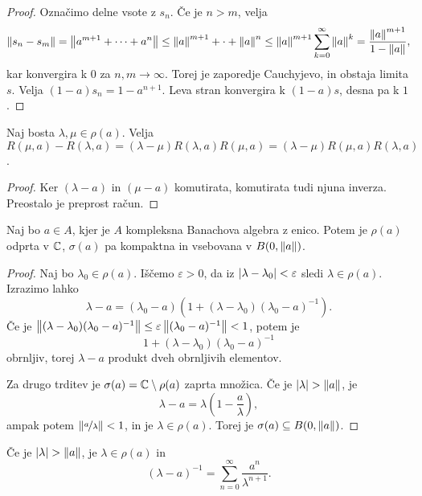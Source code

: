 \begin{proof}
  Označimo delne vsote z $s_n$.
  Če je $n > m$, velja
  \[
	\left\lVert s_n - s_m\right\rVert
	= \left\lVert a^{m+1} + \cdots + a^n\right\rVert
	\le \left\lVert a\right\rVert^{m+1} + \cdot + \left\lVert a\right\rVert^n
	\le \left\lVert a\right\rVert^{m+1} \sum_{k=0}^\infty \left\lVert a\right\rVert^k
	= \frac{\left\lVert a\right\rVert^{m+1}}{1 - \left\lVert a\right\rVert},
  \]
  kar konvergira k $0$ za $n, m \to \infty$.
  Torej je zaporedje Cauchyjevo, in obstaja limita $s$.
  Velja $(1 - a) s_n = 1 - a^{n+1}$.
  Leva stran konvergira k $(1-a)s$, desna pa k $1$.
\end{proof}

\begin{lema}
  Naj bosta $\lambda, \mu \in \rho(a)$.
  Velja $R(\mu, a) - R(\lambda, a) = (\lambda - \mu) R(\lambda, a) R(\mu, a) =
  (\lambda - \mu) R(\mu,a) R(\lambda, a)$.
\end{lema}

\begin{proof}
  Ker $(\lambda - a)$ in $(\mu - a)$ komutirata, komutirata tudi njuna inverza.
  Preostalo je preprost račun.
\end{proof}

\begin{trditev}
  Naj bo $a \in A$, kjer je $A$ kompleksna Banachova algebra z enico.
  Potem je $\rho(a)$ odprta v $\mathbb{C}$, $\sigma(a)$ pa kompaktna in vsebovana v
  $B(0, \left\lVert a\right\rVert)$.
\end{trditev}

\begin{proof}
  Naj bo $\lambda_0 \in \rho(a)$.
  Iščemo $\varepsilon > 0$, da iz $\left| \lambda - \lambda_0 \right| < \varepsilon$
  sledi $\lambda \in \rho(a)$.
  Izrazimo lahko
  \[
	\lambda - a = (\lambda_0 - a)(1 + (\lambda - \lambda_0)(\lambda_0 - a)^{-1}).
  \]
  Če je $\left\lVert(\lambda - \lambda_0)(\lambda_0 -a)^{-1}\right\rVert \le \varepsilon
  \left\lVert(\lambda_0 - a)^{-1}\right\rVert < 1$, potem je
  \[
	1 + (\lambda - \lambda_0)(\lambda_0 - a)^{-1}
  \]
  obrnljiv, torej $\lambda - a$ produkt dveh obrnljivih elementov.

  Za drugo trditev je $\sigma(a) = \mathbb{C} \setminus \rho(a)$ zaprta množica.
  Če je $\left| \lambda \right| > \left\lVert a\right\rVert$, je
  \[
	\lambda - a = \lambda (1 - \frac{a}{\lambda}),
  \]
  ampak potem $\left\lVert\nicefrac{a}{\lambda}\right\rVert < 1$, in je $\lambda \in \rho(a)$.
  Torej je $\sigma(a) \subseteq B(0, \left\lVert a\right\rVert)$.
\end{proof}

\begin{opomba}
  Če je $\left| \lambda \right| > \left\lVert a\right\rVert$, je $\lambda \in \rho(a)$ in
  \[
	(\lambda - a)^{-1} = \sum_{n=0}^\infty \frac{a^n}{\lambda^{n+1}}.
  \]
\end{opomba}

